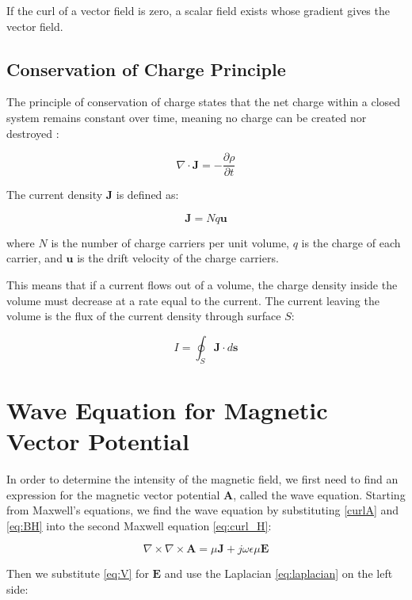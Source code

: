 If the curl of a vector field is zero, a scalar 
field exists whose gradient gives the vector field.

\subsection{Conservation of Charge Principle}

The principle of conservation of charge states 
that the net charge within a closed system remains 
constant over time, meaning no charge can be 
created nor destroyed \cite{book-magnetism}:

\begin{equation}
    \nabla \cdot \mathbf{J} = -\frac{\partial \rho}
    {\partial t}
\end{equation}

The current density \(\mathbf{J}\) is defined as:

\begin{equation}
    \mathbf{J} = N q \mathbf{u}
\end{equation}

where \(N\) is the number of charge carriers per 
unit volume, \(q\) is the charge of each carrier, 
and \(\mathbf{u}\) is the drift velocity of the 
charge carriers.

This means that if a current flows out of a volume, 
the charge density inside the volume must decrease 
at a rate equal to the current. The current leaving 
the volume is the flux of the current density 
through surface \(S\):

\begin{equation}
    I = \oint_S \mathbf{J} \cdot d\mathbf{s}
    \label{eq:defI}
\end{equation}

\section{Wave Equation for Magnetic Vector Potential}

In order to determine the intensity of the magnetic 
field, we first need to find an expression for the 
magnetic vector potential \(\mathbf{A}\), called the 
wave equation. Starting from Maxwell's equations, 
we find the wave equation by substituting \ref{curlA} 
and \ref{eq:BH} into the second Maxwell equation 
\ref{eq:curl_H}:

\[
    \nabla \times \nabla \times \mathbf{A} = 
    \mu \mathbf{J} + j\omega\epsilon \mu \mathbf{E}
\]

Then we substitute \ref{eq:V} for $\mathbf{E}$ and 
use the Laplacian \ref{eq:laplacian} on the left side:

